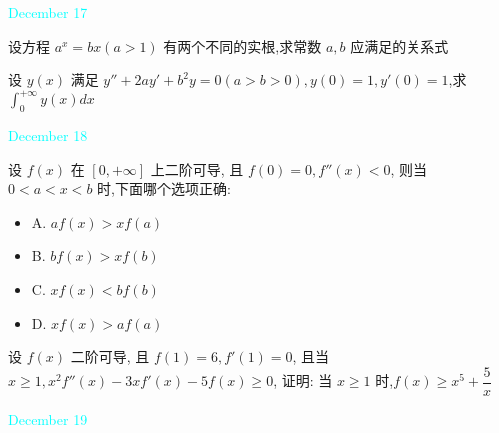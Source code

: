\begin{solution}
	
\end{solution}


\textcolor{cyan}{December 17}

\begin{example}[][Exam: 38.3.5]
	设方程 $a^{x}=bx(a>1)$ 有两个不同的实根,求常数 $a,b$ 应满足的关系式
\end{example}

\begin{solution}
	
\end{solution}

\begin{example}[][Exam: 38.3.6]
	设 $y(x)$ 满足 $y''+2ay'+b^{2}y=0(a>b>0),y(0)=1,y'(0)=1$,求 $\displaystyle{\int_{0}^{+\infty}y(x)dx}$
\end{example}

\begin{solution}
	
\end{solution}


\textcolor{cyan}{December 18}

\begin{example}[][Exam: 38.3.7]
	设 $f(x)$ 在 $[0,+\infty]$ 上二阶可导, 且 $f(0)=0,f''(x)<0$, 则当 $0<a<x<b$ 时,下面哪个选项正确:
\begin{itemize}
	\item A. $af(x)>xf(a)$
	\item B. $bf(x)>xf(b)$
	\item C. $xf(x)<bf(b)$
	\item D. $xf(x)>af(a)$
\end{itemize}
\end{example}

\begin{solution}
	
\end{solution}

\begin{example}[][Exam: 38.3.8]
	设 $f(x)$ 二阶可导, 且 $f(1)=6,f'(1)=0$, 且当 $x\geq 1, x^{2}f''(x)-3xf'(x)-5f(x)\geq 0$, 证明: 当 $x\geq 1$ 时,$f(x)\geq x^{5}+\dfrac{5}{x}$
\end{example}

\begin{solution}
	
\end{solution}


\textcolor{cyan}{December 19}

